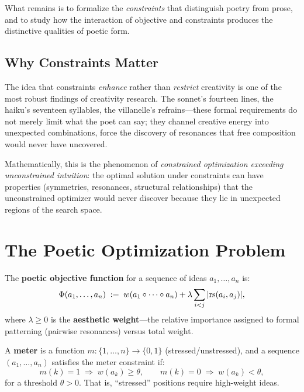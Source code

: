 What remains is to formalize the \emph{constraints} that distinguish poetry
from prose, and to study how the interaction of objective and constraints
produces the distinctive qualities of poetic form.


\subsection{Why Constraints Matter}

The idea that constraints \emph{enhance} rather than \emph{restrict} creativity
is one of the most robust findings of creativity research.  The sonnet's
fourteen lines, the haiku's seventeen syllables, the villanelle's refrains---these
formal requirements do not merely limit what the poet can say; they channel
creative energy into unexpected combinations, force the discovery of resonances
that free composition would never have uncovered.

Mathematically, this is the phenomenon of \emph{constrained optimization
exceeding unconstrained intuition}: the optimal solution under constraints can
have properties (symmetries, resonances, structural relationships) that the
unconstrained optimizer would never discover because they lie in unexpected
regions of the search space.


\section{The Poetic Optimization Problem}

\begin{definition}
\label{def:poetic-objective}
The \textbf{poetic objective function} for a sequence of ideas
$a_1, \ldots, a_n$ is:
\[
  \Phi(a_1, \ldots, a_n) \;:=\;
  w(a_1 \circ \cdots \circ a_n)
  + \lambda \sum_{i < j} |\mathrm{rs}(a_i, a_j)|,
\]
where $\lambda \geq 0$ is the \textbf{aesthetic weight}---the relative
importance assigned to formal patterning (pairwise resonances) versus
total weight.
\end{definition}

\begin{definition}
\label{def:meter}
A \textbf{meter} is a function $m: \{1, \ldots, n\} \to \{0, 1\}$
(stressed/unstressed), and a sequence $(a_1, \ldots, a_n)$ satisfies
the meter constraint if:
\[
  m(k) = 1 \;\Longrightarrow\; w(a_k) \geq \theta,
  \qquad
  m(k) = 0 \;\Longrightarrow\; w(a_k) < \theta,
\]
for a threshold $\theta > 0$.  That is, ``stressed'' positions require
high-weight ideas.
\end{definition}


